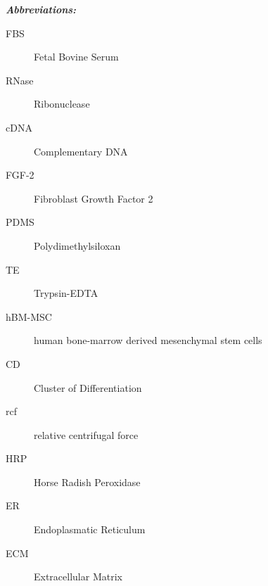 \textit{\textbf{Abbreviations:}}
\begin{description}
\item[FBS] Fetal Bovine Serum
\item[RNase] Ribonuclease
\item[cDNA] Complementary DNA
\item[FGF-2] Fibroblast Growth Factor 2
\item[PDMS] Polydimethylsiloxan
\item[TE] Trypsin-EDTA
\item[hBM-MSC] human bone-marrow derived mesenchymal stem cells 
\item[CD] Cluster of Differentiation
\item[rcf] relative centrifugal force
\item[HRP] Horse Radish Peroxidase
\item[ER] Endoplasmatic Reticulum
\item[ECM] Extracellular Matrix
\end{description}